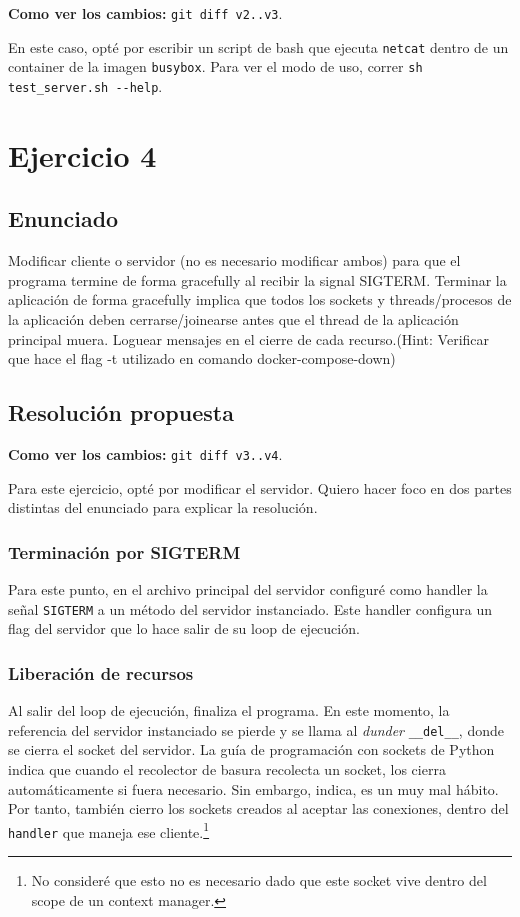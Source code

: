 \documentclass{article}
\begin{document}
\textbf{Como ver los cambios: }\texttt{git diff v2..v3}.

En este caso, opté por escribir un script de bash que ejecuta \texttt{netcat} dentro de un container de la imagen \texttt{busybox}. Para ver el modo de uso, correr \texttt{sh test\_server.sh -{}-help}.

\section{Ejercicio 4}

\subsection{Enunciado}
Modificar cliente o servidor (no es necesario modificar ambos) para que el programa termine de forma gracefully al recibir la signal SIGTERM. Terminar la aplicación de forma gracefully implica que todos los sockets y threads/procesos de la aplicación deben cerrarse/joinearse antes que el thread de la aplicación principal muera. Loguear mensajes en el cierre de cada recurso.(Hint: Verificar que hace el flag -t utilizado en comando docker-compose-down)

\subsection{Resolución propuesta}

\textbf{Como ver los cambios: }\texttt{git diff v3..v4}.

Para este ejercicio, opté por modificar el servidor. Quiero hacer foco en dos partes distintas del enunciado para explicar la resolución.

\subsubsection{Terminación por SIGTERM}
Para este punto, en el archivo principal del servidor configuré como handler la señal \texttt{SIGTERM} a un método del servidor instanciado\cite{signal}. Este handler configura un flag del servidor que lo hace salir de su loop de ejecución.

\subsubsection{Liberación de recursos}
Al salir del loop de ejecución, finaliza el programa. En este momento, la referencia del servidor instanciado se pierde y se llama al \textit{dunder} \texttt{\_\_del\_\_}\cite{DelDunder}, donde se cierra el socket del servidor. La guía de programación con sockets de Python\cite{SocketHOWTO} indica que cuando el recolector de basura recolecta un socket, los cierra automáticamente si fuera necesario. Sin embargo, indica, es un muy mal hábito. Por tanto, también cierro los sockets creados al aceptar las conexiones, dentro del \texttt{handler} que maneja ese cliente.\footnote{No consideré que esto no es necesario dado que este socket vive dentro del scope de un context manager.}
\end{document}
